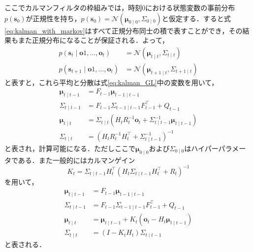     ここでカルマンフィルタの枠組みでは，時刻$0$における状態変数の事前分布$p(\bm{s}_0)$が正規性を持ち，$p(\bm{s}_0) = \mathcal{N}(\bm{\mu}_{0 \mid 0}, \Sigma_{0 \mid 0})$と仮定する．すると式\ref{eq:kalman_with_markov}はすべて正規分布同士の積で表すことができ，その結果もまた正規分布になることが保証される．よって，
    \begin{equation}
        \label{eq:normal_dist_representation}
        \begin{aligned}
            p(\bm{s}_t \mid \bm{o}1, \dots, \bm{o}_t)& = \mathcal{N}\left(\bm{\mu}_{t \mid t}, \Sigma_{t \mid t}\right)
            \\ p(\bm{s}_{t+1} \mid \bm{o}1, \dots, \bm{o}_t) &= \mathcal{N}\left(\bm{\mu}_{t+1 \mid t}, \Sigma_{t+1 \mid t}\right)
        \end{aligned}
    \end{equation}
    と表すと，これら平均と分散は式\ref{eq:kalman_GL}中の変数を用いて，
    \begin{equation}
        \label{eq:estimation_equations}
        \begin{aligned}
            \bm{\mu}_{t \mid t-1} &= F_{t-1} \bm{\mu}_{t-1 \mid t-1}
            \\\Sigma_{t \mid t-1} &= F_{t-1} \Sigma_{t-1 \mid t-1} F_{t-1}^{\top} + Q_{t-1}
            \\\bm{\mu}_{t \mid t} &= \Sigma_{t \mid t} \left( H_t R_t^{-1} \bm{o}_t + \Sigma_{t \mid t-1}^{-1} \bm{\mu}_{t \mid t-1} \right)
            \\\Sigma_{t \mid t} &= \left( H_t R_t^{-1} H_t^{\top} + \Sigma_{t \mid t-1}^{-1}\right)^{-1}
        \end{aligned}
    \end{equation}
    と表され，計算可能になる．ただしここで$\bm{\mu}_{0 \mid 0}$および$\Sigma_{0 \mid 0}$はハイパーパラメータである．また一般的にはカルマンゲイン
    \begin{equation}
        \label{eq:kalman_gain}
        K_t = \Sigma_{t \mid t-1} H_t^{\top} \left(H_t \Sigma_{t \mid t-1} H_t^{\top} + R_t\right)^{-1}
    \end{equation}
    を用いて，
    \begin{equation}
        \label{eq:estimation_equations_with_K}
        \begin{aligned}
            \bm{\mu}_{t \mid t-1} &= F_{t-1} \bm{\mu}_{t-1 \mid t-1}
            \\\Sigma_{t \mid t-1} &= F_{t-1} \Sigma_{t-1 \mid t-1} F_{t-1}^{\top} + Q_{t-1}
            \\\bm{\mu}_{t \mid t} &= \bm{\mu}_{t \mid t-1} + K_t \left(\bm{o}_t - H_t \bm{\mu}_{t \mid t-1}\right)
            \\\Sigma_{t \mid t} &= (I - K_t H_t) \Sigma_{t \mid t-1}
        \end{aligned}                    
    \end{equation}
    と表される．

